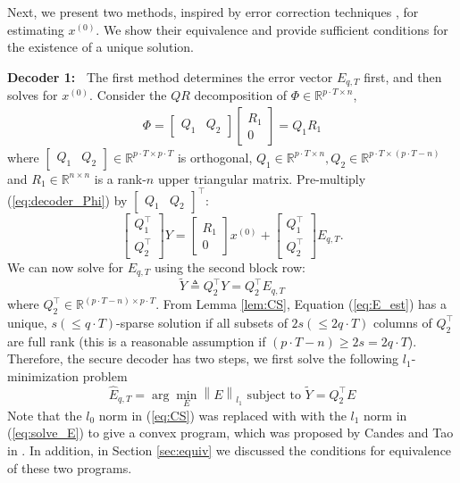 \documentclass[journal]{IEEEtran}
\newcommand{\norm}[1]{\left\lVert#1\right\rVert}
\begin{document}
Next, we present two methods, inspired by error correction techniques \cite{Candes_Tao}\cite{David_Chang}, for estimating $x^{(0)}$. We show their equivalence and provide sufficient conditions for the existence of a unique solution.

\noindent
{\bf Decoder 1:~} The first method determines the error vector $E_{q,T}$ first, and then solves for $x^{(0)}$. Consider the $QR$ decomposition of $\Phi \in \mathbb{R}^{p\cdot T \times n}$,
\begin{eqnarray}
	\Phi = \begin{bmatrix} Q_1 & Q_2 \end{bmatrix} \begin{bmatrix} R_1 \\ 0 \end{bmatrix} = Q_1 R_1 
\end{eqnarray}
where $\begin{bmatrix} Q_1 & Q_2 \end{bmatrix} \in \mathbb{R}^{p\cdot T \times p\cdot T}$ is orthogonal, $Q_1 \in \mathbb{R}^{p\cdot T\times n}, Q_2 \in \mathbb{R}^{p\cdot T \times (p\cdot T-n)}$ and $R_1 \in \mathbb{R}^{n\times n}$ is a rank-$n$ upper triangular matrix. Pre-multiply (\ref{eq:decoder_Phi}) by $\begin{bmatrix} Q_1 & Q_2 \end{bmatrix} ^\top$:
\begin{equation}
	\begin{bmatrix} Q_1 ^\top \\ Q_2 ^\top \end{bmatrix} Y = \begin{bmatrix}R_1 \\ 0  \end{bmatrix} x^{(0)} + \begin{bmatrix} Q_1 ^\top \\ Q_2^\top \end{bmatrix} E_{q,T}.
	\label{eq:QR}
\end{equation}
We can now solve for $E_{q,T}$ using the second block row:
\begin{equation}
	\tilde Y \triangleq Q_2^\top Y = Q_2^\top E_{q,T}
	\label{eq:E_est}
\end{equation}
where $Q_2^\top \in \mathbb {R} ^{ (p\cdot T-n) \times p\cdot T}$. From Lemma \ref{lem:CS}, Equation (\ref{eq:E_est}) has a unique, $s(\le q\cdot T)$-sparse solution if all subsets of $2s(\le2 q\cdot T)$ columns of $Q_2^\top$ are full rank (this is a reasonable assumption if $ (p\cdot T-n) \ge 2s = 2q\cdot T$). 
Therefore, the secure decoder has two steps, we first solve the following $l_1$-minimization problem
\begin{equation}
	\hat E_{q,T} = \arg \min_E \norm { E}_{l_1} \text{ subject to } \tilde Y = Q_2^\top E 
	\label{eq:solve_E}
\end{equation}
Note that the $l_0$ norm in (\ref{eq:CS}) was replaced with with the $l_1$ norm in (\ref{eq:solve_E}) to give a convex program, which was proposed by Candes and Tao in \cite{Candes_Tao}. In addition, in Section \ref{sec:equiv} we discussed the conditions for equivalence of these two programs.
\end{document}
